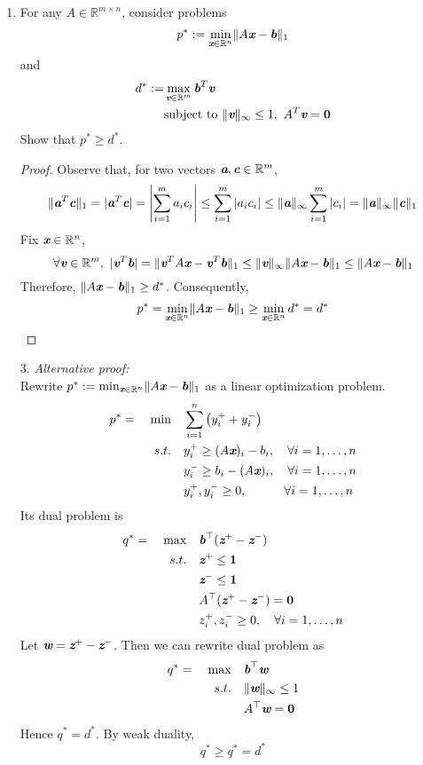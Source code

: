 \begin{enumerate}
	\newpage
	\item 
	For any $A \in \mathbb{R}^{m\times n}$, consider problems
	\[
	p^*:=\min_{\textit{\textbf{x}}\in \mathbb{R}^n}\lVert A\textit{\textbf{x}} - \textit{\textbf{b}}\rVert_1
	\]
	and
	\[
	\begin{aligned}
	d^*:=&\max_{\textit{\textbf{v}}\in \mathbb{R}^m}\textit{\textbf{b}}^T\textit{\textbf{v}}\\
	&\text{subject to } \lVert \textit{\textbf{v}}\rVert_\infty \le 1,~A^T\textit{\textbf{v}} = \textbf{0}
	\end{aligned}
	\]
	Show that $p^*\ge d^*$.
	\begin{proof}
		Observe that, for two vectors $\textit{\textbf{a}}, \textit{\textbf{c}}\in\mathbb{R}^m$, 
		\[
		\lVert \textit{\textbf{a}}^T\textit{\textbf{c}}\rVert_1 = |\textit{\textbf{a}}^T\textit{\textbf{c}}| = \left\lvert \sum_{i=1}^m a_ic_i \right\rvert \le \sum_{i=1}^m |a_ic_i| \le \lVert \textit{\textbf{a}}\rVert_\infty \sum_{i=1}^m|c_i| = \lVert \textit{\textbf{a}}\rVert_\infty \lVert \textit{\textbf{c}}\rVert_1
		\] 
		Fix $\textit{\textbf{x}} \in \mathbb{R}^n$, \[
		\forall \textit{\textbf{v}} \in \mathbb{R}^m,~ |\textit{\textbf{v}}^T\textit{\textbf{b}}|  = \lVert \textit{\textbf{v}}^T A \textit{\textbf{x}} - \textit{\textbf{v}}^T\textit{\textbf{b}}\rVert_1 \le \lVert \textit{\textbf{v}}\rVert_\infty \lVert A\textit{\textbf{x}} - \textit{\textbf{b}}\rVert_1 \le \lVert A\textit{\textbf{x}} - \textit{\textbf{b}}\rVert_1
		\]
		Therefore, $\lVert A\textit{\textbf{x}} - \textit{\textbf{b}}\rVert_1\ge d^*$.  Consequently, 
		$$
		p^* = \min_{\textit{\textbf{x}}\in \mathbb{R}^n} \lVert A\textit{\textbf{x}} - \textit{\textbf{b}}\rVert_1\ge \min_{\textit{\textbf{x}}\in \mathbb{R}^n} d^* = d^*
		$$
	\end{proof}
	\newpage 
	\item[3.] \textit{Alternative proof:}\\ Rewrite $p^* :=\min_{\textit{\textbf{x}}\in \mathbb{R}^n} \lVert A\textit{\textbf{x}}-\textit{\textbf{b}}\rVert_1$ as a linear optimization problem.
	\begin{align*}
	p^*=\quad \min \quad & \sum_{i=1}^n \left(y_i^++y_i^-\right)\\
	s.t.\quad & y_i^+ \ge (A\textit{\textbf{x}})_i - b_i,\quad \forall i =1,\ldots,n\\
	&y_i^- \ge b_i - (A\textit{\textbf{x}})_i, \quad \forall i=1,\ldots,n\\
	&y_i^+, y_i^- \ge 0,\quad \quad \quad \forall i=1,\ldots,n	
	\end{align*}
	Its dual problem is 
	\begin{align*}
	q^* = \quad \max \quad & \textit{\textbf{b}}^\top (\textit{\textbf{z}}^+-\textit{\textbf{z}}^-)\\
	s.t.\quad & \textit{\textbf{z}}^+ \le \textbf{1}\\
	&\textit{\textbf{z}}^- \le \textbf{1}\\
	&A^\top (\textit{\textbf{z}}^+-\textit{\textbf{z}}^-) = \textbf{0} \\
	&z_i^+, z_i^- \ge 0, \quad \forall i=1,\ldots,n 
	\end{align*}
	Let $\textit{\textbf{w}} = \textit{\textbf{z}}^+ - \textit{\textbf{z}}^-$. Then we can rewrite dual problem as
	\begin{align*}
	q^* = \quad \max \quad & \textit{\textbf{b}}^\top \textit{\textbf{w}}\\
	s.t.\quad &\lVert \textit{\textbf{w}}\rVert_\infty \le 1\\
	&A^\top \textit{\textbf{w}} = \textbf{0} \\
	\end{align*} 
	Hence $q^* = d^*$. By weak duality,
	\[
	q^*\ge q^*= d^*
	\]
	

\end{enumerate}
